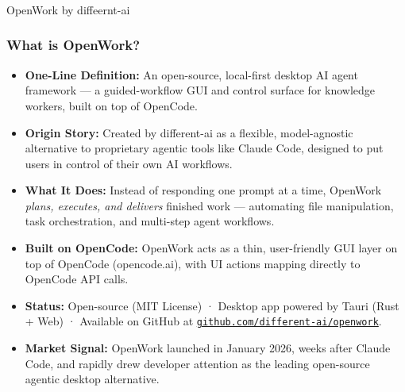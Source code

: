 \begin{frame}[fragile]\frametitle{}

\begin{center}
{\Large OpenWork by diffeernt-ai}
\end{center}
\end{frame}

\begin{frame}[fragile]\frametitle{What is OpenWork?}
  \begin{itemize}
    \item \textbf{One-Line Definition:} An open-source, local-first desktop AI agent framework — a guided-workflow GUI and control surface for knowledge workers, built on top of OpenCode.
    \item \textbf{Origin Story:} Created by different-ai as a flexible, model-agnostic alternative to proprietary agentic tools like Claude Code, designed to put users in control of their own AI workflows.
    \item \textbf{What It Does:} Instead of responding one prompt at a time, OpenWork \textit{plans, executes, and delivers} finished work — automating file manipulation, task orchestration, and multi-step agent workflows.
    \item \textbf{Built on OpenCode:} OpenWork acts as a thin, user-friendly GUI layer on top of OpenCode (opencode.ai), with UI actions mapping directly to OpenCode API calls.
    \item \textbf{Status:} Open-source (MIT License) · Desktop app powered by Tauri (Rust + Web) · Available on GitHub at \href{https://github.com/different-ai/openwork}{\texttt{github.com/different-ai/openwork}}.
    \item \textbf{Market Signal:} OpenWork launched in January 2026, weeks after Claude Code, and rapidly drew developer attention as the leading open-source agentic desktop alternative.
  \end{itemize}
\end{frame}

